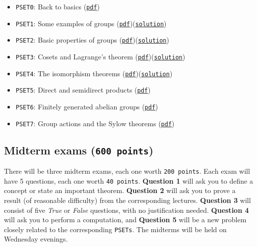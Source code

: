 \documentclass[11pt]{article}
\begin{document}
\begin{itemize}
\item \texttt{PSET0}: Back to basics (\href{https://www.dropbox.com/scl/fi/9cq8i56k0c4l8zxx5vrtt/pset0.pdf?rlkey=g8g80z674b1ywms2kkcddybg4\&dl=0}{\texttt{pdf}})
\item \texttt{PSET1}: Some examples of groups (\href{https://www.dropbox.com/scl/fi/t1cjodyterp1oi2o4xy1r/pset1.pdf?rlkey=p1spc9zhe18088o06lj5nu0e4\&dl=0}{\texttt{pdf}})(\href{https://www.dropbox.com/scl/fi/c7bftc22bv2utfx8neqsc/pset1-sol.pdf?rlkey=1kfofy7f0njfstujkcjyckuc6\&dl=0}{\texttt{solution}})
\item \texttt{PSET2}: Basic properties of groups (\href{https://www.dropbox.com/scl/fi/vmtjxwrqpgkuptwz8lywx/pset2.pdf?rlkey=nkuqr7ux74kakw2ffh57i7qax\&dl=0}{\texttt{pdf}})(\href{https://www.dropbox.com/scl/fi/zv651hjibk52ferk4sd7v/pset2-sol.pdf?rlkey=vgvuik1w9apj73wp7cbh26lsu\&dl=0}{\texttt{solution}})
\item \texttt{PSET3}: Cosets and Lagrange's theorem (\href{https://www.dropbox.com/scl/fi/qq8t6s1cnw7cqcjg6hgdk/pset3.pdf?rlkey=opzttzka6v2it3tg3w5rgflnu\&dl=0}{\texttt{pdf}})(\href{https://www.dropbox.com/scl/fi/v56wvste1kscud3fols0d/pset3-solution.pdf?rlkey=9wj2ndb083zenxw0iv5vuwiw9\&dl=0}{\texttt{solution}})
\item \texttt{PSET4}: The isomorphism theorems (\href{https://www.dropbox.com/scl/fi/f3163uprv0fxm4thy72hk/pset4.pdf?rlkey=9b1peazeg6l131ohybogzuerc\&dl=0}{\texttt{pdf}})(\href{https://www.dropbox.com/scl/fi/hee9mm14r98g89cv7lpaw/pset4-solution.pdf?rlkey=5pehee7boftvtxehidq8ahcag\&dl=0}{\texttt{solution}})
\item \texttt{PSET5}: Direct and semidirect products (\href{https://www.dropbox.com/scl/fi/wr5i7ci600fwxcuzdpjtb/pset5.pdf?rlkey=doky4q7bjl9gtmo03iu3774x1\&dl=0}{\texttt{pdf}})
\item \texttt{PSET6}: Finitely generated abelian groups (\href{https://www.dropbox.com/scl/fi/2pyhr73z9d4z0ev9wcoj0/pset6.pdf?rlkey=hy2qxhe7d8ldtd8dplopfip2a\&dl=0}{\texttt{pdf}})
\item \texttt{PSET7}: Group actions and the Sylow theorems (\href{https://www.dropbox.com/scl/fi/9j61gn6zdeohtkmzvr5sf/pset7.pdf?rlkey=tdc0c2wo3bhsw2u6d9llwr9jf\&dl=0}{\texttt{pdf}})
\end{itemize}

\subsection*{Midterm exams (\texttt{600 points})}
\label{sec:org3a54746}
There will be three midterm exams, each one worth \texttt{200 points}. Each exam will
have 5 questions, each one worth \texttt{40 points}. \textbf{Question 1} will ask you to
define a concept or state an important theorem. \textbf{Question 2} will ask you to
prove a result (of reasonable difficulty) from the corresponding lectures.
\textbf{Question 3} will consist of five \emph{True} or \emph{False} questions, with no
justification needed. \textbf{Question 4} will ask you to perform a computation, and
\textbf{Question 5} will be a new problem closely related to the corresponding
\texttt{PSETs}. The midterms will be held on Wednesday evenings.
\end{document}
